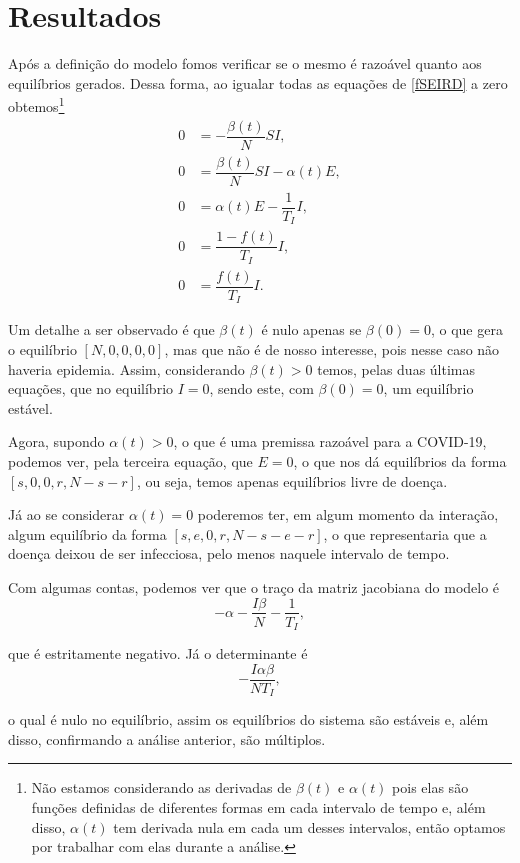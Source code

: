\documentclass{article}
\begin{document}
\section{Resultados}

Após a definição do modelo fomos verificar se o mesmo é razoável quanto aos equilíbrios gerados. Dessa forma, ao igualar todas as equações de \ref{fSEIRD} a zero obtemos\footnote{Não estamos considerando as derivadas de $\beta(t)$ e $\alpha(t)$ pois elas são funções definidas de diferentes formas em cada intervalo de tempo e, além disso, $\alpha(t)$ tem derivada nula em cada um desses intervalos, então optamos por trabalhar com elas durante a análise.}
\begin{equation*}
    \begin{split}
        0 & = -\dfrac{\beta(t)}{N}SI, \\
        0 & = \dfrac{\beta(t)}{N}SI - \alpha(t) E, \\
        0 & = \alpha(t) E - \dfrac{1}{T_I}I, \\
        0 & = \dfrac{1 - f(t)}{T_I}I, \\
        0 & = \dfrac{f(t)}{T_I}I.
    \end{split}
\end{equation*}

Um detalhe a ser observado é que $\beta(t)$ é nulo apenas se $\beta(0) = 0$, o que gera o equilíbrio $[N, 0, 0, 0, 0]$, mas que não é de nosso interesse, pois nesse caso não haveria epidemia. Assim, considerando $\beta(t) > 0$ temos, pelas duas últimas equações, que no equilíbrio $I = 0$, sendo este, com $\beta(0) = 0$, um equilíbrio estável.

Agora, supondo $\alpha(t) > 0$, o que é uma premissa razoável para a COVID-19, podemos ver, pela terceira equação, que $E = 0$, o que nos dá equilíbrios da forma $[s, 0, 0, r, N - s - r]$, ou seja, temos apenas equilíbrios livre de doença.

Já ao se considerar $\alpha(t) = 0$ poderemos ter, em algum momento da interação, algum equilíbrio da forma $[s, e, 0, r, N - s - e - r]$, o que representaria que a doença deixou de ser infecciosa, pelo menos naquele intervalo de tempo.

Com algumas contas, podemos ver que o traço da matriz jacobiana do modelo é
\[-\alpha -\dfrac{I\beta}{N} - \dfrac{1}{T_I},\]

\noindent que é estritamente negativo. Já o determinante é
\[-\dfrac{I\alpha\beta}{NT_I},\]

\noindent o qual é nulo no equilíbrio, assim os equilíbrios do sistema são estáveis e, além disso, confirmando a análise anterior, são múltiplos.
\end{document}
